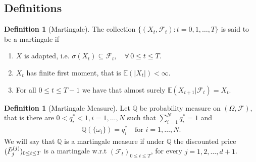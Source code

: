\documentclass{article}
\theoremstyle{definition}
\newtheorem{definition}[theorem]{Definition}
\numberwithin{equation}{section}
\begin{document}
\subsection{Definitions}
\begin{definition}[Martingale]
    The collection $\{ (X_t, \mathscr{F}_t): t = 0,1, \ldots, T \}$ is said to be a martingale if
    \begin{enumerate}
        \item $X$ is adapted, i.e. $\sigma(X_t) \subseteq \mathscr{F}_t, \quad \forall \, 0 \leq t \leq T$.
        \item $X_t$ has finite first moment, that is $\mathbb{E}(|X_t|) < \infty$. 
        \item For all $0 \leq t \leq T-1$ we have that almost surely $\mathbb{E}(X_{t + 1} | \mathscr{F}_t) = X_t$. 
    \end{enumerate}
\end{definition}
\begin{definition}[Martingale Measure]
    Let $\mathbb{Q}$ be probability measure on $(\Omega, \mathscr{F})$, that is there are $0 < q^*_i < 1, i = 1, \ldots, N$ such that $\sum_{i=1}^N q^*_i = 1$ and 
    \begin{align}
        \mathbb{Q}(\{ \omega_i \}) = q^*_i \quad \text{for } i = 1, \ldots, N. 
    \end{align}
    We will say that $\mathbb{Q}$ is a martingale measure if under $\mathbb{Q}$ the discounted price $(\Tilde{P}_j^{(j)})_{0 \leq t \leq T}$ is a martingale w.r.t $(\mathscr{F}_t)_{0 \leq t \leq T}$, for every $j = 1,2, \ldots, d+1$.
\end{definition}
\end{document}
